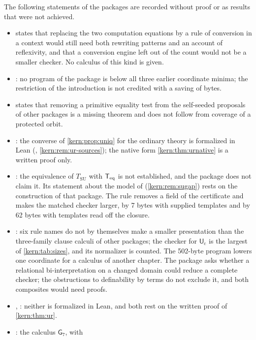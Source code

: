 The following statements of the packages are recorded without proof or as
results that were not achieved.
\begin{itemize}
\item {} states that replacing the two
 computation equations by a rule of conversion in a context would still
 need both rewriting patterns and an account of reflexivity, and that a
 conversion engine left out of the count would not be a smaller checker.
 No calculus of this kind is given.
\item {}: no program of the package is below all three
 earlier coordinate minima; the restriction of the introduction is not
 credited with a saving of bytes.
\item {} states that removing a primitive equality test
 from the self-seeded proposals of other packages is a missing theorem and
 does not follow from coverage of a protected orbit.
\item {}: the converse of \cref{kern:prop:uniq} for
 the ordinary theory is formalized in Lean (,
 \cref{kern:rem:ur-sources}); the native form \cref{kern:thm:urnative} is a
 written proof only.
\item {}: the equivalence of $T_{\mathrm{SU}}$ with $\mathsf{T}_{\mathrm{eq}}$
 is not established, and the package does not claim it.  Its statement
 about the model of  (\cref{kern:rem:sugap}) rests
 on the construction of that package.  The rule  removes a
 field of the certificate and makes the matched checker larger, by 7 bytes
 with supplied templates and by 62 bytes with templates read off the
 closure.
\item {}: six rule names do not by themselves make a
 smaller presentation than the three-family clause calculi of other
 packages; the checker for $\mathsf{U}_{\mathrm{c}}$ is the largest of
 \cref{kern:tab:sizes}, and its normalizer is counted.  The 502-byte
 program lowers one coordinate for a calculus of another chapter.  The
 package asks whether a relational bi-interpretation on a changed domain
 could reduce a complete checker; the obstructions to definability by
 terms do not exclude it, and both composites would need proofs.
\item {}, : neither is
 formalized in Lean, and both rest on the written proof of
 \cref{kern:thm:ur}.
\item {}: the calculus $\mathsf{G}_7$, with 

\end{itemize}
